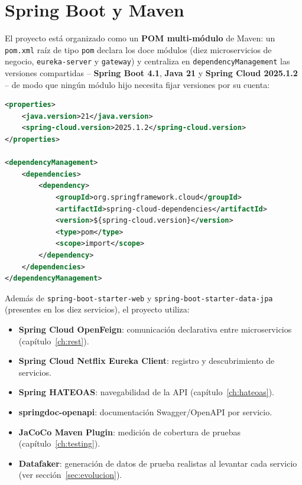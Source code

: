 \section{Spring Boot y Maven}

El proyecto está organizado como un \textbf{POM multi-módulo} de Maven: un
\texttt{pom.xml} raíz de tipo \texttt{pom} declara los doce módulos (diez
microservicios de negocio, \texttt{eureka-server} y \texttt{gateway}) y centraliza en
\texttt{dependencyManagement} las versiones compartidas -- \textbf{Spring Boot 4.1},
\textbf{Java 21} y \textbf{Spring Cloud 2025.1.2} -- de modo que ningún módulo hijo
necesita fijar versiones por su cuenta:

\begin{lstlisting}[language=XML, caption={pom.xml raíz -- fragmento relevante}]
<properties>
    <java.version>21</java.version>
    <spring-cloud.version>2025.1.2</spring-cloud.version>
</properties>

<dependencyManagement>
    <dependencies>
        <dependency>
            <groupId>org.springframework.cloud</groupId>
            <artifactId>spring-cloud-dependencies</artifactId>
            <version>${spring-cloud.version}</version>
            <type>pom</type>
            <scope>import</scope>
        </dependency>
    </dependencies>
</dependencyManagement>
\end{lstlisting}

Además de \texttt{spring-boot-starter-web} y \texttt{spring-boot-starter-data-jpa}
(presentes en los diez servicios), el proyecto utiliza:

\begin{itemize}
    \item \textbf{Spring Cloud OpenFeign}: comunicación declarativa entre
    microservicios (capítulo~\ref{ch:rest}).
    \item \textbf{Spring Cloud Netflix Eureka Client}: registro y descubrimiento de
    servicios.
    \item \textbf{Spring HATEOAS}: navegabilidad de la API (capítulo~\ref{ch:hateoas}).
    \item \textbf{springdoc-openapi}: documentación Swagger/OpenAPI por servicio.
    \item \textbf{JaCoCo Maven Plugin}: medición de cobertura de pruebas
    (capítulo~\ref{ch:testing}).
    \item \textbf{Datafaker}: generación de datos de prueba realistas al levantar cada
    servicio (ver sección~\ref{sec:evolucion}).
\end{itemize}

